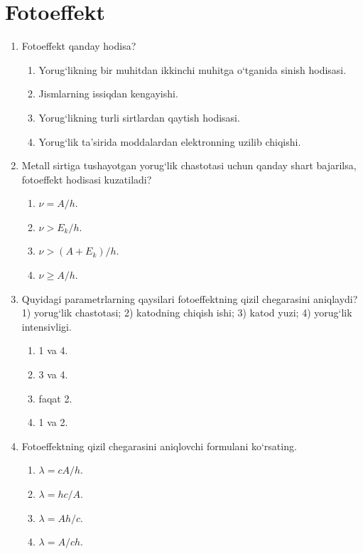 \section{Fotoeffekt}


\begin{enumerate}

\item Fotoeffekt qanday hodisa?
\begin{enumerate}[label=\Alph*)]
\item Yorug‘likning bir muhitdan ikkinchi muhitga o‘tganida sinish hodisasi.
\item Jismlarning issiqdan kengayishi.
\item Yorug‘likning turli sirtlardan qaytish hodisasi.
\item Yorug‘lik ta’sirida moddalardan elektronning uzilib chiqishi.
\end{enumerate}

\setcounter{enumi}{1}
\item Metall sirtiga tushayotgan yorug‘lik chastotasi uchun qanday shart bajarilsa, fotoeffekt hodisasi kuzatiladi?
\begin{enumerate}[label=\Alph*)]
\item $\nu = A/h$.
\item $\nu > E_k/h$.
\item $\nu > (A+E_k)/h$.
\item $\nu \ge A/h$.
\end{enumerate}

\item Quyidagi parametrlarning qaysilari fotoeffektning qizil chegarasini aniqlaydi?
1) yorug‘lik chastotasi; 2) katodning chiqish ishi; 3) katod yuzi; 4) yorug‘lik intensivligi.
\begin{enumerate}[label=\Alph*)]
\item 1 va 4.
\item 3 va 4.
\item faqat 2.
\item 1 va 2.
\end{enumerate}

\item Fotoeffektning qizil chegarasini aniqlovchi formulani ko‘rsating.
\begin{enumerate}[label=\Alph*)]
\item $\lambda = cA/h$.
\item $\lambda = hc/A$.
\item $\lambda = Ah/c$.
\item $\lambda = A/ch$.
\end{enumerate}


\end{enumerate}
